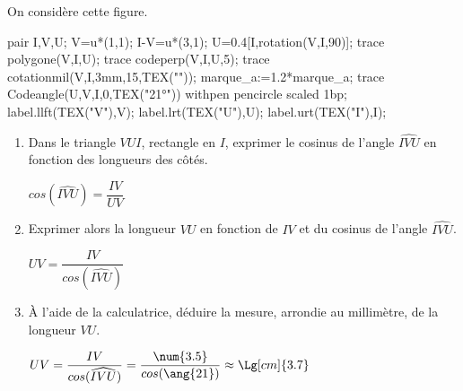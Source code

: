     On considère cette figure.

    \begin{Geometrie}
        pair I,V,U;
        V=u*(1,1);
        I-V=u*(3,1);
        U=0.4[I,rotation(V,I,90)];
        trace polygone(V,I,U);
        trace codeperp(V,I,U,5);
        trace cotationmil(V,I,3mm,15,TEX(""));
        marque_a:=1.2*marque_a;
        trace Codeangle(U,V,I,0,TEX("\ang{21}")) withpen pencircle scaled 1bp;
        label.llft(TEX("V"),V);
        label.lrt(TEX("U"),U);
        label.urt(TEX("I"),I);
    \end{Geometrie}

    \begin{enumerate}
        \item Dans le triangle $VUI$, rectangle en $I$, exprimer le cosinus de l'angle $\widehat{IVU}$ en fonction des longueurs des côtés.

        {\color{red} $cos(\widehat{IVU})=\dfrac{IV}{UV}$}
        \item Exprimer alors la longueur $VU$ en fonction de $IV$ et du cosinus de l'angle $\widehat{IVU}$.

        {\color{red} $UV=\dfrac{IV}{cos(\widehat{IVU})}$}
        \item À l'aide de la calculatrice, déduire la mesure, arrondie au millimètre, de la longueur $VU$.

        {\color{red} $UV=\dfrac{IV}{cos(\widehat{IVU})}=\dfrac{\num{3.5}}{cos(\ang{21})}\approx\Lg[cm]{3.7}$}
    \end{enumerate}
